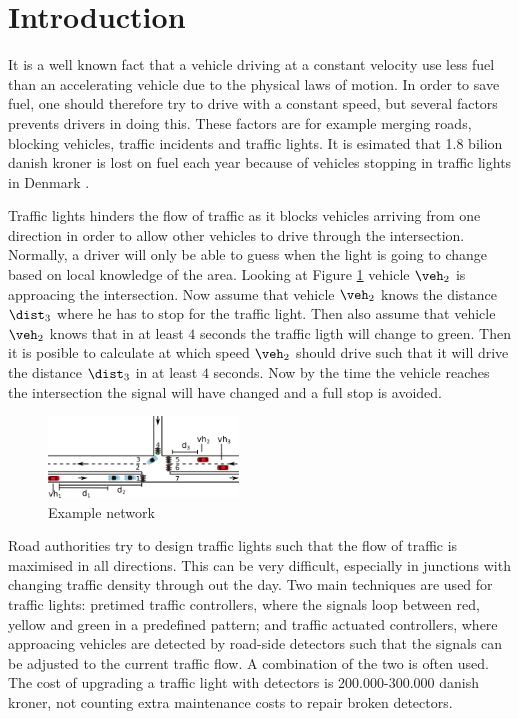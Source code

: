 \section{Introduction}

It is a well known fact that a vehicle driving at a constant velocity use less fuel than an accelerating vehicle due to the physical laws of motion\cite{Vejdir}.
In order to save fuel, one should therefore try to drive with a constant speed, but several factors prevents drivers in doing this. 
These factors are for example merging roads, blocking vehicles, traffic incidents and traffic lights. 
It is esimated that 1.8 bilion danish kroner is lost on fuel each year because of vehicles stopping in traffic lights in Denmark \cite{Vejdir}.

Traffic lights hinders the flow of traffic as it blocks vehicles arriving from one direction in order to allow other vehicles to drive through the intersection.
Normally, a driver will only be able to guess when the light is going to change based on local knowledge of the area. 
Looking at Figure \ref{fig:Introduction:network} vehicle $\veh_2$ is approacing the intersection.
Now assume that vehicle $\veh_2$ knows the distance $\dist_3$ where he has to stop for the traffic light. 
Then also assume that vehicle $\veh_2$ knows that in at least $4$ seconds the traffic ligth will change to green. 
Then it is posible to calculate at which speed $\veh_2$ should drive such that it will drive the distance $\dist_3$ in at least $4$ seconds. 
Now by the time the vehicle reaches the intersection the signal will have changed and a full stop is avoided.
\begin{figure}[htb]
\centering
\includegraphics[width=0.45\textwidth]{../images/introNetwork.png}
\caption{Example network}
\label{fig:Introduction:network}
\end{figure}

Road authorities try to design traffic lights such that the flow of traffic is maximised in all directions.
This can be very difficult, especially in junctions with changing traffic density through out the day.
Two main techniques are used for traffic lights: pretimed traffic controllers, where the signals loop between red, yellow and green in a predefined pattern; and traffic actuated controllers, where approacing vehicles are detected by road-side detectors such that the signals can be adjusted to the current traffic flow.
A combination of the two is often used.
The cost of upgrading a traffic light with detectors is 200.000-300.000 danish kroner, not counting extra maintenance costs to repair broken detectors\cite{Vejdir}.

